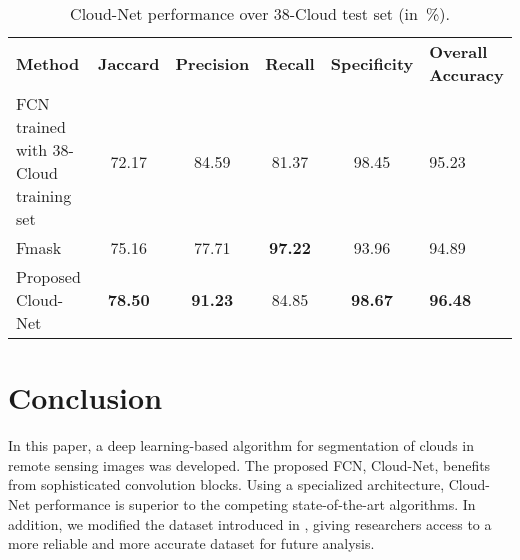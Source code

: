\documentclass{article}
\begin{document}
\renewcommand{\tabcolsep}{3pt}
\vspace{-4mm}
\begin{table}[h]
\small
\begin{minipage}[t]{0.49\textwidth}
\centering
\caption{Cloud-Net performance over 38-Cloud test set (in~\%).
\vspace{-2mm}
\label{Tab:numerical}} \begin{tabular}{|m{17mm}|c|c|c|c|m{13mm}|}
\hline
\centering \textbf{Method}   & \textbf{Jaccard}                       & \textbf{Precision}   & \textbf{Recall} & \textbf{Specificity} & \textbf{Overall Accuracy}   \\ 
\hhline{|=|=|=|=|=|=|}
FCN \cite{mymmsp} trained with 38-Cloud training set & 72.17 & 84.59
  & 81.37 &   98.45  & \hspace{2mm} 95.23 \\ \hline
Fmask \cite{fmask2}    & 75.16  & 77.71 & \textbf{97.22} &  93.96 & \hspace{2mm} 94.89 \\ \hline
Proposed Cloud-Net  & \textbf{78.50} &  \textbf{91.23}&  84.85  & \textbf{98.67} & \hspace{2mm} \textbf{96.48}
\\ \hline
\end{tabular}
\end{minipage}
\vspace{-5mm}
\end{table}



\vspace{-2mm}
\section{Conclusion}
In this paper, a deep learning-based algorithm for segmentation of clouds in remote sensing images was developed. The proposed FCN, Cloud-Net, benefits from sophisticated convolution blocks. Using a specialized architecture, Cloud-Net performance is superior to the competing state-of-the-art algorithms. In addition, we modified the dataset introduced in \cite{mymmsp}, giving researchers access to a more reliable and more accurate dataset for future analysis.




\vspace{-5mm}


\end{document}
